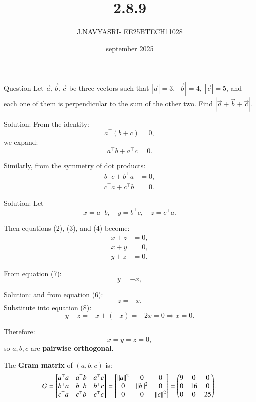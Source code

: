 \documentclass{beamer}
\title %
{2.8.9}
\date{september 2025}
\author %
{J.NAVYASRI- EE25BTECH11028}
\begin{document}
\frame{\titlepage}
\begin{frame}{Question}
Let $\vec{a}, \vec{b}, \vec{c}$ be three vectors such that 
$|\vec{a}|=3,\; |\vec{b}|=4,\; |\vec{c}|=5$, and each one of them is perpendicular to the sum of the other two. 
Find $|\vec{a}+\vec{b}+\vec{c}|$.
\end{frame}


\begin{frame}{Solution:}
From the identity:
\begin{equation} \label{eq1}
a^\top(b + c) = 0,
\end{equation}
we expand:
\begin{equation} \label{eq2}
a^\top b + a^\top c = 0.
\end{equation}

Similarly, from the symmetry of dot products:
\begin{align}
b^\top c + b^\top a &= 0, \label{eq3} \\
c^\top a + c^\top b &= 0. \label{eq4}
\end{align}
\end{frame}
\begin{frame}{Solution:}
Let
\begin{equation} \label{eq5}
x = a^\top b, \quad y = b^\top c, \quad z = c^\top a.
\end{equation}

Then equations (2), (3), and (4) become:
\begin{align}
x + z &= 0, \label{eq6} \\
x + y &= 0, \label{eq7} \\
y + z &= 0. \label{eq8}
\end{align}

From equation (7):
\[
y = -x,
\]
\end{frame}
\begin{frame}{Solution:}
and from equation (6):
\[
z = -x.
\]
Substitute into equation (8):
\[
y + z = -x + (-x) = -2x = 0 \Rightarrow x = 0.
\]

Therefore:
\begin{equation} \label{eq9}
x = y = z = 0,
\end{equation}
so \( a, b, c \) are \textbf{pairwise orthogonal}.

\bigskip

The \textbf{Gram matrix} of \( (a, b, c) \) is:
\begin{equation} \label{eq10}
G =
\begin{bmatrix}
a^\top a & a^\top b & a^\top c \\
b^\top a & b^\top b & b^\top c \\
c^\top a & c^\top b & c^\top c
\end{bmatrix}
=
\begin{bmatrix}
\|a\|^2 & 0 & 0 \\
0 & \|b\|^2 & 0 \\
0 & 0 & \|c\|^2
\end{bmatrix}
=
\begin{pmatrix}
9 & 0 & 0 \\
0 & 16 & 0 \\
0 & 0 & 25
\end{pmatrix}.
\end{equation}
\end{frame}
\end{document}
